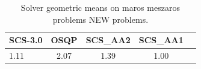 \begin{table}
\centering
\caption{Solver geometric means on maros meszaros problems NEW problems.}
\label{t-maros meszaros problems NEW-geom_mean}
\begin{tabular}{lcccc}
\toprule
 SCS-3.0 &  OSQP &  SCS\_AA2 &  SCS\_AA1 \\
\midrule
    1.11 &  2.07 &     1.39 &     1.00 \\
\bottomrule
\end{tabular}
\end{table}
